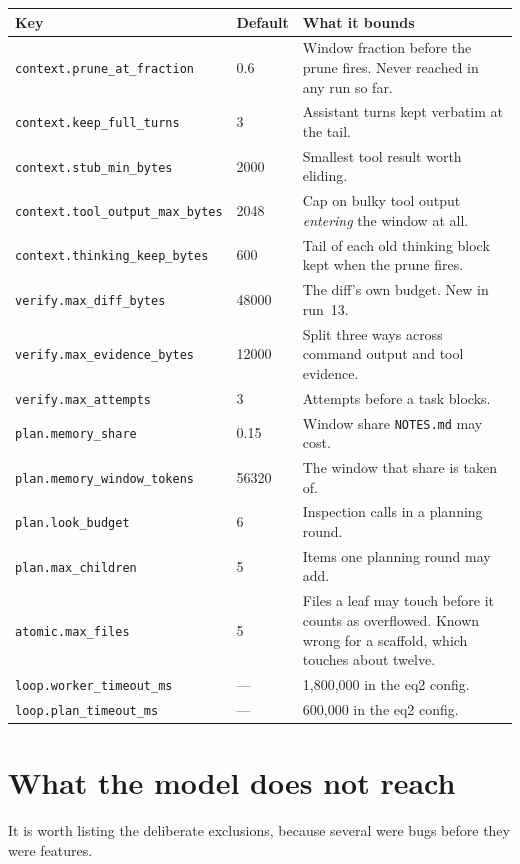 \documentclass[11pt,a4paper]{article}
\newcommand{\file}[1]{\texttt{#1}}
\newcommand{\key}[1]{\texttt{#1}}
\begin{document}
\begin{longtable}{@{}llp{}@{}}
\toprule
\textbf{Key} & \textbf{Default} & \textbf{What it bounds} \\
\midrule
\endhead
\key{context.prune\_at\_fraction} & 0.6 & Window fraction before the prune
fires. Never reached in any run so far. \\
\key{context.keep\_full\_turns} & 3 & Assistant turns kept verbatim at the tail. \\
\key{context.stub\_min\_bytes} & 2000 & Smallest tool result worth eliding. \\
\key{context.tool\_output\_max\_bytes} & 2048 & Cap on bulky tool output
\emph{entering} the window at all. \\
\key{context.thinking\_keep\_bytes} & 600 & Tail of each old thinking block
kept when the prune fires. \\
\midrule
\key{verify.max\_diff\_bytes} & 48000 & The diff's own budget. New in run~13. \\
\key{verify.max\_evidence\_bytes} & 12000 & Split three ways across command
output and tool evidence. \\
\key{verify.max\_attempts} & 3 & Attempts before a task blocks. \\
\midrule
\key{plan.memory\_share} & 0.15 & Window share \file{NOTES.md} may cost. \\
\key{plan.memory\_window\_tokens} & 56320 & The window that share is taken of. \\
\key{plan.look\_budget} & 6 & Inspection calls in a planning round. \\
\key{plan.max\_children} & 5 & Items one planning round may add. \\
\midrule
\key{atomic.max\_files} & 5 & Files a leaf may touch before it counts as
overflowed. Known wrong for a scaffold, which touches about twelve. \\
\key{loop.worker\_timeout\_ms} & --- & 1{,}800{,}000 in the eq2 config. \\
\key{loop.plan\_timeout\_ms} & --- & 600{,}000 in the eq2 config. \\
\bottomrule
\end{longtable}

\section{What the model does not reach}

It is worth listing the deliberate exclusions, because several were bugs before
they were features.
\end{document}
